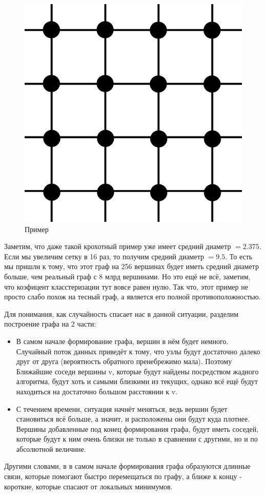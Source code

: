 \begin{figure}[H]
    \centering
    \includegraphics[scale=0.1]{./pictures/Square_grid_graph.svg.png}
    \caption{Пример } \label{lattice}
\end{figure}

Заметим, что даже такой крохотный пример уже имеет средний диаметр $= 2.375$.
Если мы увеличим сетку в 16 раз, то получим средний диаметр $= 9.5$. То есть мы пришли к тому,
что этот граф на 256 вершинах будет иметь средний диаметр больше, чем реальный
граф с 8 млрд вершинами. Но это ещё не всё, заметим, что коэфицент класстеризации тут 
вовсе равен нулю. Так что, этот пример не просто слабо похож на тесный граф, а является 
его полной противоположностью.

Для понимания, как случайность спасает нас в данной ситуации, разделим построение
графа на 2 части:
\begin{itemize}
    \item В самом начале формирование графа, вершин в нём будет немного. Случайный поток данных
    приведёт к тому, что узлы будут достаточно далеко друг от друга (вероятность
    обратного пренебрежимо мала). Поэтому Ближайшие соседи вершины v, которые будут найдены
    посредством жадного алгоритма, будут хоть и самыми близкими из текущих, однако всё
    ещё будут находиться на достаточно большом расстоянии к v. 
    \item С течением времени, ситуация начнёт меняться, ведь вершин будет становиться всё больше,
    а значит, и расположены они будут куда плотнее. Вершины добавленные под конец формирования графа,
    будут иметь соседей, которые будут к ним очень близки не только в сравнении с другими, но и
    по абсолютной величине.
\end{itemize}

Другими словами, в в самом начале формирования графа образуются длинные связи, которые помогают
быстро перемещаться по графу, а ближе к концу - короткие, которые спасают от локальных минимумов.